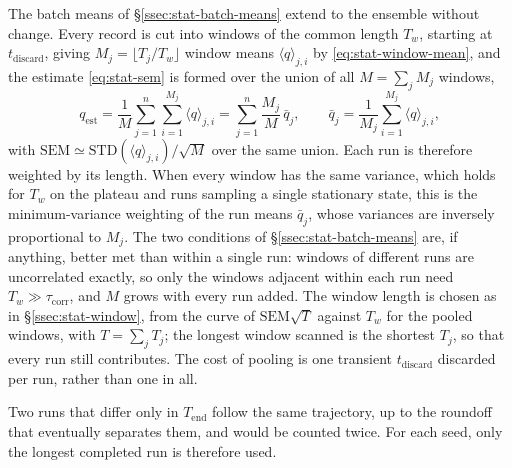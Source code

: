 \documentclass{article}
\begin{document}
The batch means of \S\ref{ssec:stat-batch-means} extend to the ensemble
without change. Every record is cut into windows of the common length $T_w$,
starting at $t_{\mathrm{discard}}$, giving $M_j = \lfloor T_j / T_w \rfloor$
window means $\langle q \rangle_{j,i}$ by \eqref{eq:stat-window-mean}, and the
estimate \eqref{eq:stat-sem} is formed over the union of all
$M = \sum_j M_j$ windows,
\begin{equation}\label{eq:stat-ensemble-mean}
  q_{\mathrm{est}} = \frac{1}{M} \sum_{j=1}^{n} \sum_{i=1}^{M_j}
  \langle q \rangle_{j,i} = \sum_{j=1}^{n} \frac{M_j}{M}\, \bar q_j ,
  \qquad
  \bar q_j = \frac{1}{M_j} \sum_{i=1}^{M_j} \langle q \rangle_{j,i} ,
\end{equation}
with $\mathrm{SEM} \simeq \mathrm{STD}(\langle q \rangle_{j,i}) / \sqrt{M}$
over the same union. Each run is therefore weighted by its length. When every
window has the same variance, which holds for $T_w$ on the plateau and runs
sampling a single stationary state, this is the minimum-variance weighting of
the run means $\bar q_j$, whose variances are inversely proportional to $M_j$.
The two conditions of \S\ref{ssec:stat-batch-means} are, if anything, better
met than within a single run: windows of different runs are uncorrelated
exactly, so only the windows adjacent within each run need $T_w \gg
\tau_{\mathrm{corr}}$, and $M$ grows with every run added. The window length
is chosen as in \S\ref{ssec:stat-window}, from the curve of
$\mathrm{SEM}\sqrt{T}$ against $T_w$ for the pooled windows, with
$T = \sum_j T_j$; the longest window scanned is the shortest $T_j$, so that
every run still contributes. The cost of pooling is one transient
$t_{\mathrm{discard}}$ discarded per run, rather than one in all.

Two runs that differ only in $T_{\mathrm{end}}$ follow the same trajectory,
up to the roundoff that eventually separates them, and would be counted twice.
For each seed, only the longest completed run is therefore used.
\end{document}
